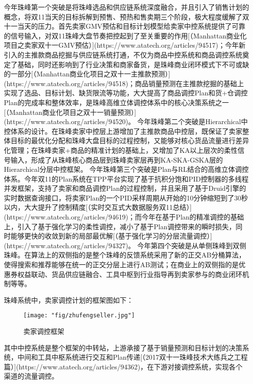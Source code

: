 今年珠峰第一个突破是将珠峰选品和供应链系统深度融合，并且引入了销售计划的概念，将双11当天的目标拆解到预售、预热和售卖期三个阶段，极大程度缓解了双十一当天的压力。首先卖家GMV预估和目标计划模型给卖家中控系统提供了可靠的信号输入，对双11珠峰大盘节奏把控起到了至关重要的作用[（Manhattan商业化项目之卖家双十一GMV预估）](https://www.atatech.org/articles/94517)；今年新引入的主推款商品挖掘与供应链系统打通，不仅为商品中控系统和商品调控系统奠定了基础，同时还影响到了行业决策和商家备货，是珠峰商业闭环模式下不可或缺的一部分[（Manhattan商业化项目之双十一主推款预测）](https://www.atatech.org/articles/94518)；商品销量预测在主推款挖掘的基础上实现了选品、目标计划、缺货限流等功能，大大提高了商品调控Plan和货+仓调控Plan的完成率和整体效率，是珠峰高维立体调控体系中的核心决策系统之一[（Manhattan商业化项目之双十一销量预测）](https://www.atatech.org/articles/94520)。
今年珠峰第二个突破是Hierarchical中控体系的设计。在珠峰卖家中控层上游增加了主推款商品中控层，既保证了卖家整体目标的最优化分配和珠峰大盘目标的过程控制，又能够对核心货品流量进行差异化管理；在珠峰卖家+商品的精准计划的基础上，又增加了KA以上层次的柔性信号输入，形成了从珠峰核心商品层到珠峰卖家层再到KA-SKA-GSKA层的Hierarchical分层中控框架。
今年珠峰第三个突破是Plan与RL结合的高维立体调控体系。今年双11的Plan系统在TPP平台实现了基于抗积分饱和PID控制器的多线程并发框架，支持了卖家和商品调控Plan的过程控制，并且采用了基于Druid引擎的实时数据查询接口，将卖家Plan的一个PID采样周期从开始的10分钟缩短到了30秒以内，大大提升了控制精度[（实时交互式大数据服务双11总结）](https://www.atatech.org/articles/94619)；而今年在基于Plan的精准调控的基础上，引入了基于强化学习的柔性调控，减小了基于Plan调控带来的瞬时损失，同时能够更快的收敛到新的局部最优解[（基于强化学习的分层流量调控）](https://www.atatech.org/articles/94327)。
今年第四个突破是从单侧珠峰到双侧珠峰。在算法上的双侧指的是整个珠峰的反馈系统采用了新的正交AB分桶算法，使得搜索和推荐能够在统一的正交分层上进行AB测试；在商业上的双侧指的是优惠券权益联动、货品供应链融合、工具中枢到行业指导再到卖家参与的商业闭环机制等等。

珠峰系统中，卖家调控计划的框架图如下：

\begin{figure}[!h]
	\centering
	\texttt{[image: "fig/zhufengseller.jpg"]}
	\caption{卖家调控框架}
	\label{fig:zhufengseller}
\end{figure}

其中中控系统是整个框架的中转站，上游承接了基于销量预测和目标计划的决策系统，中间和工具中枢系统进行交互和Plan传递[（2017双十一珠峰技术大练兵之工程篇）](https://www.atatech.org/articles/94362)，在下游对接调控系统，实现各个渠道的流量调控。

